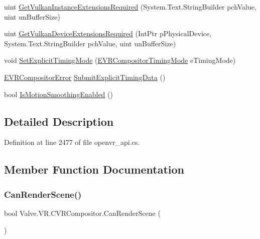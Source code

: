 \begin{DoxyCompactItemize}
\item 
uint \mbox{\hyperlink{class_valve_1_1_v_r_1_1_c_v_r_compositor_a523c233f1c331d3ea933d232ea30a240}{Get\+Vulkan\+Instance\+Extensions\+Required}} (System.\+Text.\+String\+Builder pch\+Value, uint un\+Buffer\+Size)
\item 
uint \mbox{\hyperlink{class_valve_1_1_v_r_1_1_c_v_r_compositor_a1b8bff776ef6b0c4440d8c9735875cc2}{Get\+Vulkan\+Device\+Extensions\+Required}} (Int\+Ptr p\+Physical\+Device, System.\+Text.\+String\+Builder pch\+Value, uint un\+Buffer\+Size)
\item 
void \mbox{\hyperlink{class_valve_1_1_v_r_1_1_c_v_r_compositor_a2c85589e4811758a11387e005218b55b}{Set\+Explicit\+Timing\+Mode}} (\mbox{\hyperlink{namespace_valve_1_1_v_r_a9fcb102e844540a2246475933f824463}{E\+V\+R\+Compositor\+Timing\+Mode}} e\+Timing\+Mode)
\item 
\mbox{\hyperlink{namespace_valve_1_1_v_r_ac34ee1034fda668ccd45f57676ded81b}{E\+V\+R\+Compositor\+Error}} \mbox{\hyperlink{class_valve_1_1_v_r_1_1_c_v_r_compositor_a0e8337d82a7bad865f61247681800e54}{Submit\+Explicit\+Timing\+Data}} ()
\item 
bool \mbox{\hyperlink{class_valve_1_1_v_r_1_1_c_v_r_compositor_a67073ace392a3be7d0ccbf1781f0d2cd}{Is\+Motion\+Smoothing\+Enabled}} ()
\end{DoxyCompactItemize}


\subsection{Detailed Description}


Definition at line 2477 of file openvr\+\_\+api.\+cs.



\subsection{Member Function Documentation}
\mbox{\label{class_valve_1_1_v_r_1_1_c_v_r_compositor_a6b732598f98df9faaef2687f95e72582}} 
\subsubsection{\texorpdfstring{CanRenderScene()}{CanRenderScene()}}
{\footnotesize\ttfamily bool Valve.\+V\+R.\+C\+V\+R\+Compositor.\+Can\+Render\+Scene (\begin{DoxyParamCaption}{ }\end{DoxyParamCaption})}



